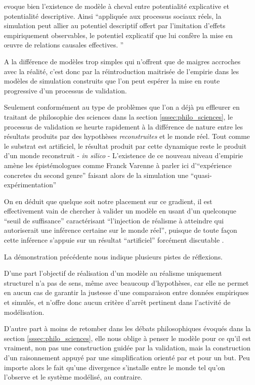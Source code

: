 \textcite{Bulle2005} evoque bien l'existence de modèle à cheval entre potentialité explicative et potentialité descriptive. Ainsi \enquote{appliquée aux processus sociaux réels, la simulation peut allier au potentiel descriptif offert par l’imitation d’effets empiriquement observables, le potentiel explicatif que lui confère la mise en œuvre de relations causales effectives. }

A la différence de modèles trop simples qui n'offrent que de maigres accroches avec la réalité, c'est donc par la réintroduction maitrisée de l'empirie dans les modèles de simulation construits que l'on peut espérer la mise en route progressive d'un processus de validation.

Seulement conformément au type de problèmes que l'on a déjà pu effleurer en traitant de philosophie des sciences dans la section \ref{sssec:philo_sciences}, le processus de validation se heurte rapidement à la différence de nature entre les résultats produits par des hypothèses \textit{reconstruites} et le monde réel. Tout comme le substrat est artificiel, le résultat produit par cette dynamique reste le produit d'un monde reconstruit - \textit{in silico} - L'existence de ce nouveau niveau d'empirie amène les épistémologues comme Franck Varenne à parler ici d'\enquote{expérience concretes du second genre} faisant alors de la simulation une \enquote{quasi-expérimentation} \autocites{Varenne2001, Varenne2007, Phan2008}

On en déduit que quelque soit notre placement sur ce gradient, il est effectivement vain de chercher à valider un modèle en usant d'un quelconque \enquote{seuil de suffisance} caractérisant \enquote{l'injection de réalisme à atteindre qui autoriserait une inférence certaine sur le monde réel}, puisque de toute façon cette inférence s'appuie sur un résultat \enquote{artificiel} forcément discutable  .

La démonstration précédente nous indique plusieurs pistes de réflexions.

D'une part l'objectif de réalisation d'un modèle au réalisme uniquement structurel n'a pas de sens, même avec beaucoup d'hypothèses, car elle ne permet en aucun cas de garantir la justesse d'une comparaison entre données empiriques et simulés, et n'offre donc aucun critère d'arrêt pertinent dans l'activité de modélisation.

D'autre part à moins de retomber dans les débats philosophiques évoqués dans la section \ref{sssec:philo_sciences}, elle nous oblige à penser le modèle pour ce qu'il est vraiment, non pas une construction guidée par la validation, mais la construction d'un raisonnement appuyé par une simplification orienté par et pour un but. Peu importe alors le fait qu'une divergence s'installe entre le monde tel qu'on l'observe et le système modélisé, au contraire.

